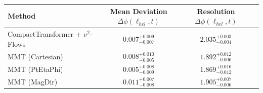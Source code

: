     \begin{tabular}{lccc}
        \toprule
        Method & Mean Deviation $\Delta\phi(\ell_{hel}, t)$ & Resolution $\Delta\phi(\ell_{hel}, t)$ \\
        \midrule
        CompactTransformer + $\nu^2$-Flows & $0.007^{+0.009}_{-0.007}$ & $2.035^{+0.003}_{-0.004}$ \\
        MMT (Cartesian) & $0.008^{+0.010}_{-0.005}$ & $1.892^{+0.012}_{-0.006}$ \\
        MMT (PtEtaPhi) & $0.005^{+0.008}_{-0.009}$ & $1.869^{+0.016}_{-0.012}$ \\
        MMT (MagDir) & $0.011^{+0.007}_{-0.008}$ & $1.905^{+0.007}_{-0.006}$ \\
        \bottomrule
    \end{tabular}
